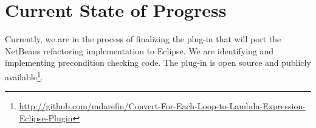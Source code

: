 \section{Current State of Progress}

Currently, we are in the process of finalizing the plug-in that will port the
NetBeans refactoring implementation to Eclipse. We are identifying and
implementing precondition checking code. The plug-in is open source and
publicly
available\footnote{\url{http://github.com/mdarefin/Convert-For-Each-Loop-to-Lambda-Expression-Eclipse-Plugin}}.
